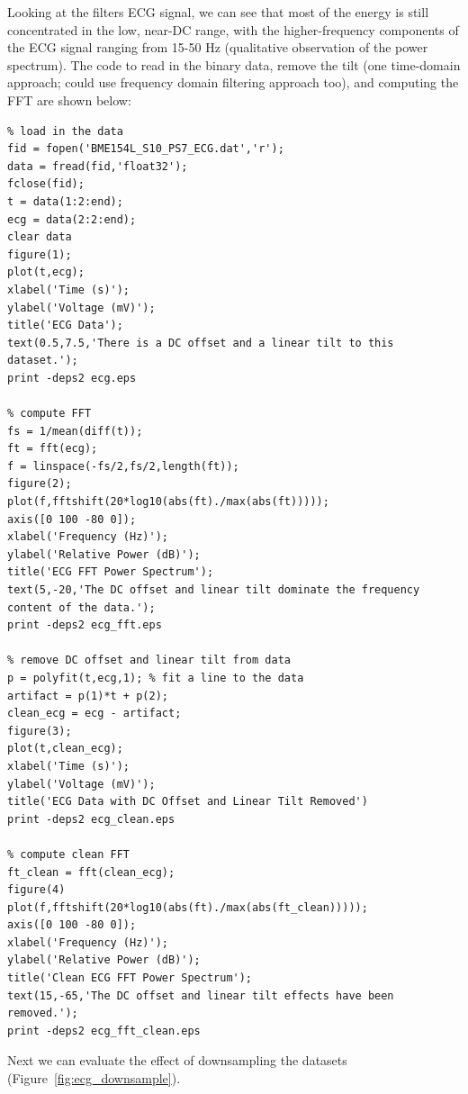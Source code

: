 Looking at the filters ECG signal, we can see that most of the energy is still
concentrated in the low, near-DC range, with the higher-frequency components of
the ECG signal ranging from 15-50 Hz (qualitative observation of the power
spectrum).  The code to read in the binary data, remove the tilt (one
time-domain approach; could use frequency domain filtering approach too), and
computing the FFT are shown below:

\begin{verbatim}
% load in the data
fid = fopen('BME154L_S10_PS7_ECG.dat','r');
data = fread(fid,'float32');
fclose(fid);
t = data(1:2:end);
ecg = data(2:2:end);
clear data
figure(1);
plot(t,ecg);
xlabel('Time (s)');
ylabel('Voltage (mV)');
title('ECG Data');
text(0.5,7.5,'There is a DC offset and a linear tilt to this dataset.');
print -deps2 ecg.eps

% compute FFT
fs = 1/mean(diff(t));
ft = fft(ecg);
f = linspace(-fs/2,fs/2,length(ft));
figure(2);
plot(f,fftshift(20*log10(abs(ft)./max(abs(ft)))));
axis([0 100 -80 0]);
xlabel('Frequency (Hz)');
ylabel('Relative Power (dB)');
title('ECG FFT Power Spectrum');
text(5,-20,'The DC offset and linear tilt dominate the frequency content of the data.');
print -deps2 ecg_fft.eps

% remove DC offset and linear tilt from data
p = polyfit(t,ecg,1); % fit a line to the data
artifact = p(1)*t + p(2);
clean_ecg = ecg - artifact;
figure(3);
plot(t,clean_ecg);
xlabel('Time (s)');
ylabel('Voltage (mV)');
title('ECG Data with DC Offset and Linear Tilt Removed')
print -deps2 ecg_clean.eps

% compute clean FFT
ft_clean = fft(clean_ecg);
figure(4)
plot(f,fftshift(20*log10(abs(ft)./max(abs(ft_clean)))));
axis([0 100 -80 0]);
xlabel('Frequency (Hz)');
ylabel('Relative Power (dB)');
title('Clean ECG FFT Power Spectrum');
text(15,-65,'The DC offset and linear tilt effects have been removed.');
print -deps2 ecg_fft_clean.eps
\end{verbatim}

Next we can evaluate the effect of downsampling the datasets (Figure~\ref{fig:ecg_downsample}).

